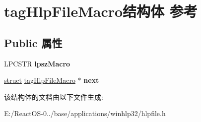 \hypertarget{structtag_hlp_file_macro}{}\section{tag\+Hlp\+File\+Macro结构体 参考}
\label{structtag_hlp_file_macro}
\subsection*{Public 属性}
\begin{DoxyCompactItemize}
\item 
\mbox{\label{structtag_hlp_file_macro_a1d781d0e82873cc3910b3cbbf79dcbd3}} 
L\+P\+C\+S\+TR {\bfseries lpsz\+Macro}
\item 
\mbox{\label{structtag_hlp_file_macro_a2564abc31a2e8f25cf8a477eafe92a29}} 
\hyperlink{interfacestruct}{struct} \hyperlink{structtag_hlp_file_macro}{tag\+Hlp\+File\+Macro} $\ast$ {\bfseries next}
\end{DoxyCompactItemize}


该结构体的文档由以下文件生成\+:\begin{DoxyCompactItemize}
\item 
E\+:/\+React\+O\+S-\/0../base/applications/winhlp32/hlpfile.\+h\end{DoxyCompactItemize}
